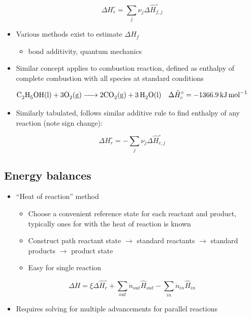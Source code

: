 \documentclass[11pt]{article}
\begin{document}
\[ \Delta H^{\circ}_{r} = \sum_{j} \nu_{j} \Delta \hat{H}_{f,j}^{\circ} \]

\begin{itemize}
\item Various methods exist to estimate \(\Delta H_{f}\)
\begin{itemize}
\item bond additivity, quantum mechanics
\end{itemize}

\item Similar concept applies to combustion reaction, defined as enthalpy of complete combustion with all species at standard conditions
\end{itemize}

\[ \ce{C2H5OH (l) + 3 O2(g) -> 2 CO2(g) + 3H2O(l)}\quad \Delta\hat{H}^{\circ}_{c} = \SI{-1366.9}{\kilo\joule\per\mole} \]

\begin{itemize}
\item Similarly tabulated, follows similar additive rule to find enthalpy of any reaction (note sign change):
\end{itemize}

\[ \Delta H^{\circ}_{r} = -\sum_{j} \nu_{j} \Delta \hat{H}_{c,j}^{\circ} \]

\subsection{Energy balances}
\label{sec-11-3}
\begin{itemize}
\item ``Heat of reaction'' method
\begin{itemize}
\item Choose a convenient reference state for each reactant and product, typically ones for with the heat of reaction is known
\item Construct path reactant state $\to$ standard reactants $\to$ standard products $\to$ product state
\item Easy for single reaction
\end{itemize}
\end{itemize}

\[ \Delta \dot{H} = \xi\Delta\hat{H}^{\circ}_{r} + \sum_{out}\dot{n}_{out}\hat{H}_{out}-\sum_{in}\dot{n}_{in}\hat{H}_{in} \]

\begin{itemize}
\item Requires solving for multiple advancements for parallel reactions
\end{itemize}
\end{document}
